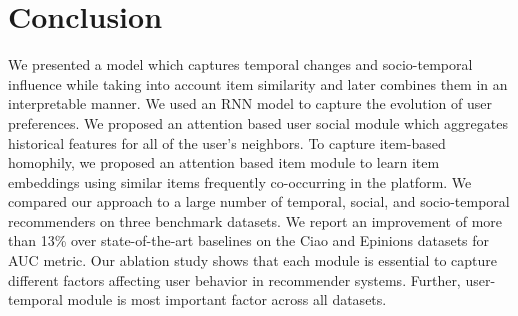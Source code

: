 \section{Conclusion}
We presented a model which captures temporal changes and socio-temporal influence while taking into account item similarity and later combines them in an interpretable manner.
We used an RNN model to capture the evolution of user preferences. We proposed an attention based user social module which aggregates historical features for all of the user's neighbors. To capture item-based homophily, we proposed an attention based item module to learn item embeddings using similar items frequently co-occurring in the platform.
We compared our approach to a large number of temporal, social, and socio-temporal recommenders on three benchmark datasets. We report an improvement of more than 13\%
over state-of-the-art baselines on the  Ciao and Epinions datasets for AUC metric.
Our ablation study shows that each module is essential to capture different factors affecting user behavior in recommender systems. Further, user-temporal module is most important factor across all datasets.

